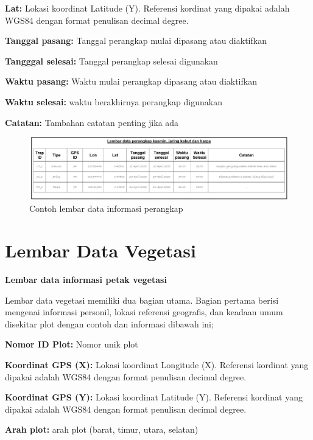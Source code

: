 \documentclass[
]{book}
\begin{document}
\textbf{Lat:} Lokasi koordinat Latitude (Y). Referensi kordinat yang dipakai adalah WGS84 dengan format penulisan decimal degree.

\textbf{Tanggal pasang:} Tanggal perangkap mulai dipasang atau diaktifkan

\textbf{Tangggal selesai:} Tanggal perangkap selesai digunakan

\textbf{Waktu pasang:} Waktu mulai perangkap dipasang atau diaktifkan

\textbf{Waktu selesai:} waktu berakhirnya perangkap digunakan

\textbf{Catatan:} Tambahan catatan penting jika ada

\begin{figure}

{\centering \includegraphics[width=1\linewidth]{images/ldm_p} 

}

\caption{Contoh lembar data informasi perangkap}\label{fig:ldmp}
\end{figure}

\hypertarget{lembar-data-vegetasi}{%
\section*{Lembar Data Vegetasi}\label{lembar-data-vegetasi}}

\textbf{Lembar data informasi petak vegetasi}

Lembar data vegetasi memiliki dua bagian utama. Bagian pertama berisi mengenai informasi personil, lokasi referensi geografis, dan keadaan umum disekitar plot dengan contoh dan informasi dibawah ini;

\textbf{Nomor ID Plot:} Nomor unik plot

\textbf{Koordinat GPS (X):} Lokasi koordinat Longitude (X). Referensi kordinat yang dipakai adalah WGS84 dengan format penulisan decimal degree.

\textbf{Koordinat GPS (Y):} Lokasi koordinat Latitude (Y). Referensi kordinat yang dipakai adalah WGS84 dengan format penulisan decimal degree.

\textbf{Arah plot:} arah plot (barat, timur, utara, selatan)
\end{document}
